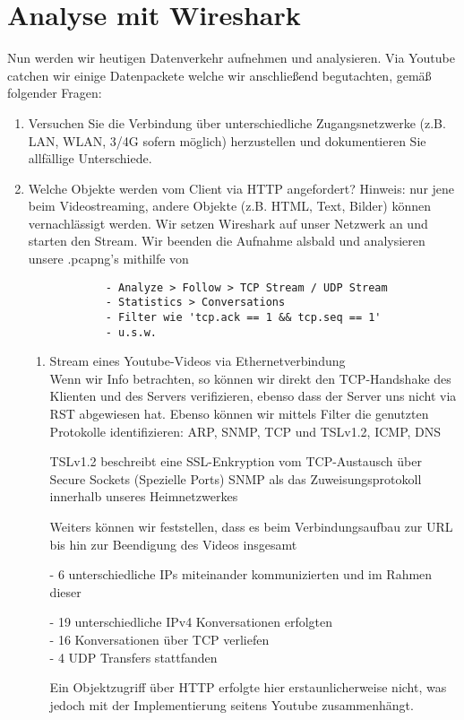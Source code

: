 \documentclass[11pt]{article}
\begin{document}
    \section{Analyse mit Wireshark}
    Nun werden wir heutigen Datenverkehr aufnehmen und analysieren. Via Youtube catchen wir
    einige Datenpackete welche wir anschließend begutachten, gemäß folgender Fragen:

    \begin{enumerate}
        \item Versuchen Sie die Verbindung über unterschiedliche Zugangsnetzwerke (z.B. LAN, WLAN, 3/4G sofern möglich) herzustellen und dokumentieren Sie allfällige Unterschiede.
        \item Welche Objekte werden vom Client via HTTP angefordert? Hinweis: nur jene beim Videostreaming, andere Objekte (z.B. HTML, Text, Bilder) können vernachlässigt werden.
            Wir setzen Wireshark auf unser Netzwerk an und starten  den Stream.
            Wir beenden die Aufnahme alsbald und analysieren unsere .pcapng's mithilfe von
        \begin{verbatim}
            - Analyze > Follow > TCP Stream / UDP Stream
            - Statistics > Conversations
            - Filter wie 'tcp.ack == 1 && tcp.seq == 1'
            - u.s.w.
        \end{verbatim}
        \begin{enumerate}[\thesection .1]
            \item Stream eines Youtube-Videos via Ethernetverbindung\\
            Wenn wir Info betrachten, so können wir direkt den TCP-Handshake des Klienten und des Servers verifizieren, ebenso dass
            der Server uns nicht via RST abgewiesen hat.
            Ebenso können wir mittels Filter die genutzten Protokolle identifizieren: ARP,  SNMP, TCP und TSLv1.2, ICMP, DNS
            \begin{addmargin}[1em]{1em}
                TSLv1.2 beschreibt eine SSL-Enkryption vom TCP-Austausch über Secure Sockets (Spezielle Ports)
                SNMP als das Zuweisungsprotokoll innerhalb unseres Heimnetzwerkes
            \end{addmargin}
            Weiters können wir feststellen, dass es beim Verbindungsaufbau zur URL bis hin zur Beendigung des Videos insgesamt
            \begin{addmargin}[1em]{1em}
                - 6 unterschiedliche IPs miteinander kommunizierten und im Rahmen dieser
                \begin{addmargin}[1em]{1em}
                    - 19 unterschiedliche IPv4 Konversationen erfolgten\\
                    - 16 Konversationen über TCP verliefen\\
                    - 4 UDP Transfers stattfanden\\
                \end{addmargin}
            \end{addmargin}
            Ein Objektzugriff über HTTP erfolgte hier erstaunlicherweise nicht, was jedoch mit der Implementierung seitens Youtube zusammenhängt.\\


\end{enumerate}
\end{enumerate}
\end{document}

